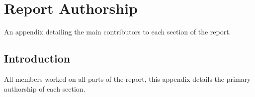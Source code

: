 \chapter{Report Authorship} \label{Chapter:Report Authorship}

\begin{preamble}
	An appendix detailing the main contributors to each section of the report.
\end{preamble}

\section{Introduction}

All members worked on all parts of the report, this appendix details the primary authorship of each section.


